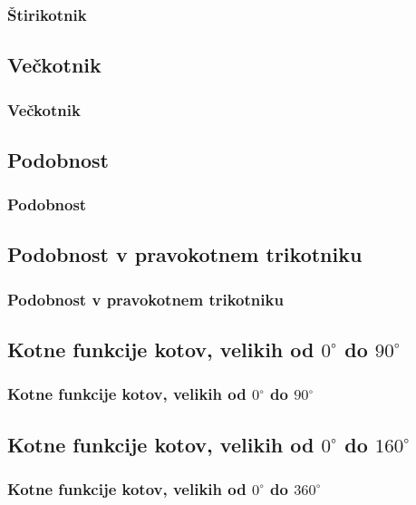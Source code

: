        \begin{frame}
            \frametitle{Štirikotnik}
        \end{frame}

    \subsection{Večkotnik}

        \begin{frame}
            \frametitle{Večkotnik}
        \end{frame}

    \subsection{Podobnost}

        \begin{frame}
            \frametitle{Podobnost}
        \end{frame}

    \subsection{Podobnost v pravokotnem trikotniku}
        
        \begin{frame}
            \frametitle{Podobnost v pravokotnem trikotniku}
        \end{frame}

    \subsection{Kotne funkcije kotov, velikih od $0^\circ$ do $90^\circ$}
        
        \begin{frame}
            \frametitle{Kotne funkcije kotov, velikih od $0^\circ$ do $90^\circ$}
        \end{frame}
        
    \subsection{Kotne funkcije kotov, velikih od $0^\circ$ do $160^\circ$}
        
        \begin{frame}
            \frametitle{Kotne funkcije kotov, velikih od $0^\circ$ do $360^\circ$}
        \end{frame}
